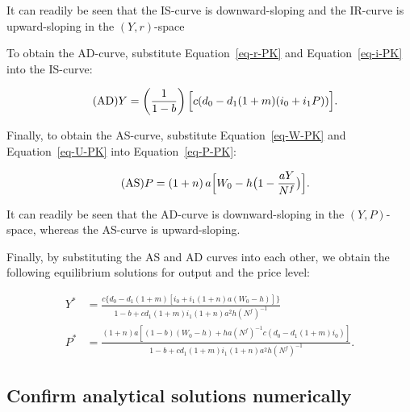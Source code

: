 \documentclass[
  letterpaper,
  DIV=11,
  numbers=noendperiod]{scrreprt}
\begin{document}
It can readily be seen that the IS-curve is downward-sloping and the
IR-curve is upward-sloping in the \((Y, r)\)-space

To obtain the AD-curve, substitute Equation~\ref{eq-r-PK} and
Equation~\ref{eq-i-PK} into the IS-curve:

\begin{align}\label{eq:AD}\tag{AD}
Y&=\left(\frac{1}{1-b}\right)\Bigl[c(d_0 -d_1(1+m)(i_0+i_1P))\Bigr].
\end{align}

Finally, to obtain the AS-curve, substitute Equation~\ref{eq-W-PK} and
Equation~\ref{eq-U-PK} into Equation~\ref{eq-P-PK}:

\begin{align}\label{eq:AS}\tag{AS}
P&=\left(1+n\right)a\Bigl[W_0-h\bigl(1-\frac{aY}{N^f}\bigr)\Bigr].
\end{align}

It can readily be seen that the AD-curve is downward-sloping in the
\((Y, P)\)-space, whereas the AS-curve is upward-sloping.

Finally, by substituting the AS and AD curves into each other, we obtain
the following equilibrium solutions for output and the price level:

\begin{align*}
Y^*&=\frac{c\{d_0-d_1(1+m)[i_0+i_1(1+n)a(W_0-h)]\}}{1-b+cd_1(1+m)i_1(1+n)a^2h(N^f)^{-1}} \\
P^*&=\frac{(1+n)a[(1-b)(W_0-h)+ha(N^f)^{-1}c(d_0-d_1(1+m)i_0)]}{1-b+cd_1(1+m)i_1(1+n)a^2h(N^f)^{-1}}.
\end{align*}

\subsection{Confirm analytical solutions
numerically}\label{confirm-analytical-solutions-numerically}
\end{document}
